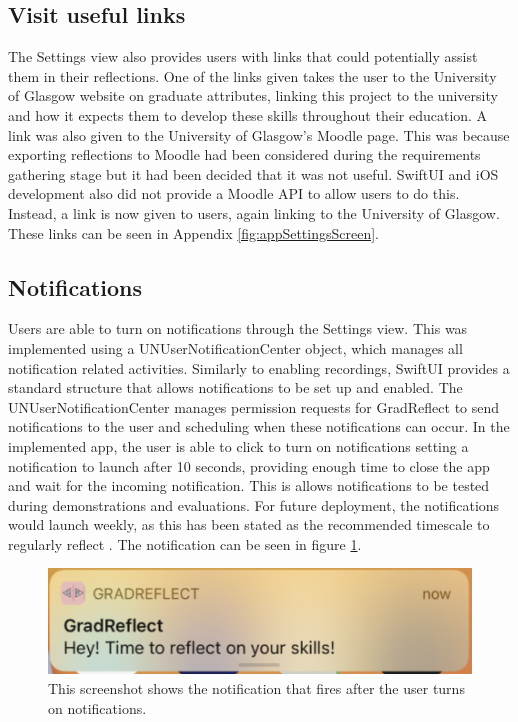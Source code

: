 \documentclass{l4proj}
\begin{document}
\subsection{Visit useful links}

The Settings view also provides users with links that could potentially assist them in their reflections. One of the links given takes the user to the University of Glasgow website on graduate attributes, linking this project to the university and how it expects them to develop these skills throughout their education. A link was also given to the University of Glasgow's Moodle page. This was because exporting reflections to Moodle had been considered during the requirements gathering stage but it had been decided that it was not useful. SwiftUI and iOS development also did not provide a Moodle API to allow users to do this. Instead, a link is now given to users, again linking to the University of Glasgow. These links can be seen in Appendix \ref{fig:appSettingsScreen}.

\subsection{Notifications}

Users are able to turn on notifications through the Settings view. This was implemented using a UNUserNotificationCenter object, which manages all notification related activities. Similarly to enabling recordings, SwiftUI provides a standard structure that allows notifications to be set up and enabled. The UNUserNotificationCenter manages permission requests for GradReflect to send notifications to the user and scheduling when these notifications can occur. In the implemented app, the user is able to click to turn on notifications setting a notification to launch after 10 seconds, providing enough time to close the app and wait for the incoming notification. This is allows notifications to be tested during demonstrations and evaluations. For future deployment, the notifications would launch weekly, as this has been stated as the recommended timescale to regularly reflect \citep{bruno_reflective_2018}. The notification can be seen in figure \ref{fig:Notification}.

\begin{figure}
    \centering
    \includegraphics[scale=0.4]{images/Notification.pdf}    
    \caption{This screenshot shows the notification that fires after the user turns on notifications.}
    \label{fig:Notification} 
\end{figure}
\end{document}
